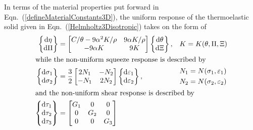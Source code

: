 In terms of the material properties put forward in Eqn.~(\ref{defineMaterialConstants3D}), the uniform response of the thermo\-elastic solid given in Eqn.~(\ref{Helmholtz3Disotropic}) takes on the form of 
\begin{subequations}
    \label{HelmholtzODEs}
    \begin{align}
    \left\{ \begin{matrix}
    \mathrm{d} \eta \\ \mathrm{d} \Pi 
    \end{matrix} \right\} & = \begin{bmatrix}
    C / \theta - 9 \alpha^2 K / \rho & 9 \alpha K / \rho \\
    -9 \alpha K & 9K
    \end{bmatrix} \left\{ \begin{matrix}
    \mathrm{d} \theta \\ \mathrm{d} \Xi 
    \end{matrix} \right\} , & &
    K = K ( \theta , \Pi , \Xi )
    \label{HelmholtzODEsUniform} \\
    \intertext{while the non-uniform squeeze response is described by}
    \left\{ \begin{matrix}
    \mathrm{d} \sigma_1 \\ \mathrm{d} \sigma_2
    \end{matrix} \right\} & = \frac{3}{2} \begin{bmatrix}
    2 N_1 & -N_2 \\
    -N_1 & 2N_2
    \end{bmatrix} \left\{ \begin{matrix}
    \mathrm{d} \varepsilon_1 \\ \mathrm{d} \varepsilon_2
    \end{matrix} \right\} , 
    & & \begin{aligned}
    N_1 & = N ( \sigma_1 , \varepsilon_1 ) \\
    N_2 & = N ( \sigma_2 , \varepsilon_2 )
    \end{aligned}
    \label{HelmholtzODEsSqueeze} \\
    \intertext{and the non-uniform shear response is described by}
    \left\{ \begin{matrix}
    \mathrm{d} \tau_1 \\ \mathrm{d} \tau_2 \\ \mathrm{d} \tau_3
    \end{matrix} \right\} & = \begin{bmatrix}
    G_1 & 0 & 0 \\ 0 & G_2 & 0 \\ 0 & 0 & G_3

\end{bmatrix}
\end{align}
\end{subequations}
